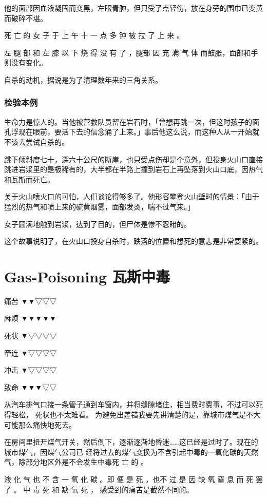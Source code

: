 \documentclass[UTF8]{ctexart}
\begin{document}
他的面部因血液凝固而变黑，左眼青肿，但只受了点轻伤，放在身旁的围巾已变黄而破碎不堪。 

死 亡 的 女 子 于 上 午 十 一 点 多 钟 被 拉 了 上 来 。

左 腿 部 和 左 膝 以 下 烧 得 没 有 了 ，腿部 因 充 满 气 体 而鼓胀，面部和手则没有变化。

自杀的动机，据说是为了清理数年来的三角关系。

\subsubsection*{检验本例}

生命力是惊人的。当他被营救队员留在岩石时，「曾想再跳一次，但这时孩子的面孔浮现在眼前，要活下去的信念涌了上来。」事后他这么说，而这种人从一开始就不该去尝试自杀的。

跳下倾斜度七十，深六十公尺的断崖，也只受点伤却是个意外，但投身火山口直接跳进岩浆里的是极稀有的，大半都在半路上撞到岩石上再坠落到火山口底，因热气和瓦斯而死亡。

关于火山喷火口的可怕，人们谈论得够多了。他形容攀登火山壁时的情景：「由于猛烈的热气和喷上来的硫黄烟雾，面部发烫，喘不过气来。」

女子圆满地触到岩浆，达到了目的，但尸体是惨不忍睹的。

这个故事说明了，在火山口投身自杀时，跌落的位置和想死的意志是非常要紧的。

\newpage

\section{Gas-Poisoning 瓦斯中毒}

痛苦 ▼▼▽▽▽

麻烦 ▼▼▼▼▼

死状 ▼▽▽▽▽

牵连 ▼▽▽▽▽

冲击 ▼▽▽▽▽

致命 ▼▼▼▽▽

从汽车排气口接一条管子通到车窗内，并将缝隙堵住，相当费时费事，不过可以死得轻松， 死状也不太难看。 
为避免出差错我要先讲清楚的是，靠城市煤气是不大可能那么痛快地死去。

在房间里扭开煤气开关，然后倒下，逐渐逐渐地昏迷……这已经是过时了。现在的城市煤气，因煤气公司已 经将过去的煤气变换为不含引起中毒的一氧化碳的天然气，除部分地区外是不会发生中毒死 亡 的 。

液 化 气 也 不 含 一 氧 化 碳 。即 便 是 死 ，也不 过 是 因 缺 氧 窒 息 而 死 罢 了 。
中 毒 死 和 缺 氧 死 ， 感受到的痛苦是截然不同的。
\end{document}
